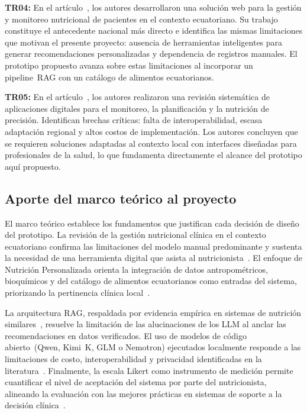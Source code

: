 \medskip

\textbf{TR04:} En el artículo~\cite{quichimbo2021}, los autores desarrollaron una
solución web para la gestión y monitoreo nutricional de pacientes en el
contexto ecuatoriano. Su trabajo constituye el antecedente nacional más
directo e identifica las mismas limitaciones que motivan el presente
proyecto: ausencia de herramientas inteligentes para generar
recomendaciones personalizadas y dependencia de registros manuales.
El prototipo propuesto avanza sobre estas limitaciones al incorporar un
pipeline~RAG con un catálogo de alimentos ecuatorianos.

\medskip

\textbf{TR05:} En el artículo~\cite{abeltino2025}, los autores realizaron una
revisión sistemática de aplicaciones digitales para el monitoreo, la
planificación y la nutrición de precisión. Identifican brechas críticas:
falta de interoperabilidad, escasa adaptación regional y altos costos de
implementación. Los autores concluyen que se requieren soluciones adaptadas
al contexto local con interfaces diseñadas para profesionales de la salud,
lo que fundamenta directamente el alcance del prototipo aquí propuesto.

\subsection{Aporte del marco teórico al proyecto}

El marco teórico establece los fundamentos que justifican cada decisión de
diseño del prototipo. La revisión de la gestión nutricional clínica en el
contexto ecuatoriano confirma las limitaciones del modelo manual
predominante y sustenta la necesidad de una herramienta digital que asista
al nutricionista~\cite{vargas2025,quichimbo2021}. El enfoque de Nutrición
Personalizada orienta la integración de datos antropométricos, bioquímicos
y del catálogo de alimentos ecuatorianos como entradas del sistema,
priorizando la pertinencia clínica local~\cite{siddiqui2025,aldarras2025}.

La arquitectura RAG, respaldada por evidencia empírica en sistemas de
nutrición similares~\cite{gavai2025,arshad2025}, resuelve la limitación
de las alucinaciones de los LLM al anclar las recomendaciones en datos
verificados. El uso de modelos de código abierto~(Qwen, Kimi~K, GLM o
Nemotron) ejecutados localmente responde a las limitaciones de costo,
interoperabilidad y privacidad identificadas en la
literatura~\cite{abeltino2025,ebadi2025}. Finalmente, la escala Likert
como instrumento de medición permite cuantificar el nivel de aceptación
del sistema por parte del nutricionista, alineando la evaluación con las
mejores prácticas en sistemas de soporte a la decisión
clínica~\cite{ghose2021,lee2023}.
